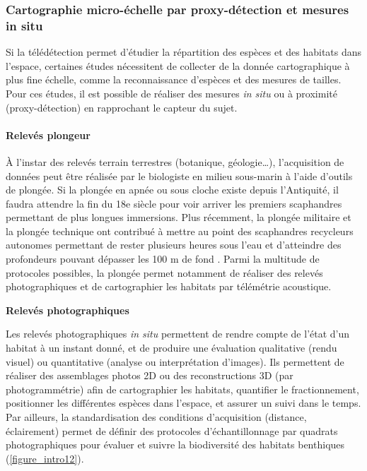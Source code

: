 \setlength{\fboxsep}{5pt}
\setlength{\fboxrule}{0.6pt}
\noindent{}

\subsubsection{Cartographie micro-échelle par proxy-détection et mesures in situ}\label{intro.2.2.2}

Si la télédétection permet d’étudier la répartition des espèces et des habitats dans l’espace, certaines études nécessitent de collecter de la donnée cartographique à plus fine échelle, comme la reconnaissance d’espèces et des mesures de tailles. Pour ces études, il est possible de réaliser des mesures \textit{in situ} ou à proximité (proxy-détection) en rapprochant le capteur du sujet.

\paragraph{Relevés plongeur}

À l’instar des relevés terrain terrestres (botanique, géologie…), l’acquisition de données peut être réalisée par le biologiste en milieu sous-marin à l’aide d’outils de plongée. Si la plongée en apnée ou sous cloche existe depuis l’Antiquité, il faudra attendre la fin du 18e siècle pour voir arriver les premiers scaphandres permettant de plus longues immersions. Plus récemment, la plongée militaire et la plongée technique ont contribué à mettre au point des scaphandres recycleurs autonomes permettant de rester plusieurs heures sous l’eau et d’atteindre des profondeurs pouvant dépasser les 100 m de fond \citep{sieber_review_2010}. Parmi la multitude de protocoles possibles, la plongée permet notamment de réaliser des relevés photographiques et de cartographier les habitats par télémétrie acoustique.

\noindent\textbf{Relevés photographiques}

Les relevés photographiques \textit{in situ} permettent de rendre compte de l’état d’un habitat à un instant donné, et de produire une évaluation qualitative (rendu visuel) ou quantitative (analyse ou interprétation d’images). Ils permettent de réaliser des assemblages photos 2D ou des reconstructions 3D (par photogrammétrie) afin de cartographier les habitats, quantifier le fractionnement, positionner les différentes espèces dans l’espace, et assurer un suivi dans le temps. Par ailleurs, la standardisation des conditions d’acquisition (distance, éclairement) permet de définir des protocoles d’échantillonnage par quadrats photographiques pour évaluer et suivre la biodiversité des habitats benthiques \citep{deter_rapid_2012} (\autoref{figure_intro12}).

